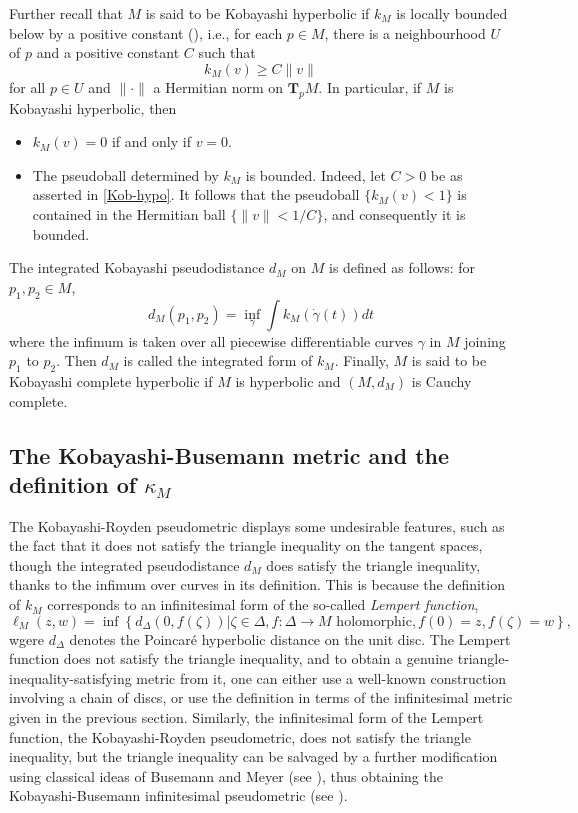 \documentclass[a4paper,11pt,reqno]{amsart}
\theoremstyle{plain}
\theoremstyle{definition}
\theoremstyle{remark}
\theoremstyle{remark}
\numberwithin{equation}{section}
\begin{document}
Further recall that $ M $ is said to be Kobayashi hyperbolic if $ k_M $ is locally bounded below by a positive constant (\cite{Roy}), i.e., for each $ p \in M $, there is a neighbourhood $ U $ of $ p $ and a positive constant $ C $ such that
\begin{equation} \label{Kob-hypo}
k_M (v) \geq C \|v\| 
\end{equation}
for all $ p \in U $  and $ \| \cdot\| $ a Hermitian norm on $ \textbf{T}_p M $. In particular, if $ M $ is Kobayashi hyperbolic, then 
\begin{itemize}
   \item  $ k_M(v) =0 $ if and only if $ v = 0 $.
   \item  The pseudoball determined by $ k_M $ is bounded. Indeed, let $  C > 0 $ be as asserted in \eqref{Kob-hypo}. It follows that the pseudoball $ \{ k_M(v) < 1 \} $ is contained in the Hermitian ball $ \{ \|v\| < 1/C \} $, and consequently it is bounded.
\end{itemize}
The integrated Kobayashi pseudodistance $ d_M $ on $ M $ is defined as follows: for $ p_1, p_2 \in M $,
\[
d_M(p_1,p_2) = \inf_{\gamma} \int k_M \left( \dot{\gamma}(t) \right)dt
\]
where the infimum is taken over all piecewise differentiable curves $ \gamma $ in $ M $ joining $ p_1 $ to $ p_2 $. Then $ d_M $ is called the integrated form of $ k_M $. Finally, $ M $ is said to be Kobayashi complete hyperbolic if $ M $ is hyperbolic and $ (M, d_M) $ is Cauchy complete. 

\subsection{The Kobayashi-Busemann metric and the definition of $\kappa_M$}
The Kobayashi-Royden pseudometric displays some undesirable features, 
such as the fact that it does not satisfy the triangle
inequality on the tangent spaces, though the integrated pseudodistance $d_M$ does satisfy the triangle inequality,
thanks to the infimum over curves in its definition. This is because the definition of $k_M$ corresponds to an infinitesimal form of the so-called \emph{Lempert function},
\[\ell_M(z,w)=\inf\left\{ \left.d_\Delta(0, f(\zeta))\right|\zeta\in \Delta,  f:\Delta \to M \text{ holomorphic}, f(0)=z, f(\zeta)=w \right\},\]
wgere $d_\Delta$ denotes the Poincaré hyperbolic distance on the unit disc. The Lempert function does not satisfy the triangle inequality, and 
to obtain a genuine triangle-inequality-satisfying metric from it, one can either use a well-known construction involving a chain of discs, or use
the definition in terms of the infinitesimal metric given in the previous section. Similarly,
the infinitesimal form of the Lempert function, the Kobayashi-Royden pseudometric, does
not satisfy the triangle inequality, but the triangle inequality can be salvaged by a further 
modification using classical ideas of Busemann and Meyer (see \cite{busemann}), thus obtaining 
the Kobayashi-Busemann infinitesimal
pseudometric (see \cite{kobayashi3}).
\end{document}

